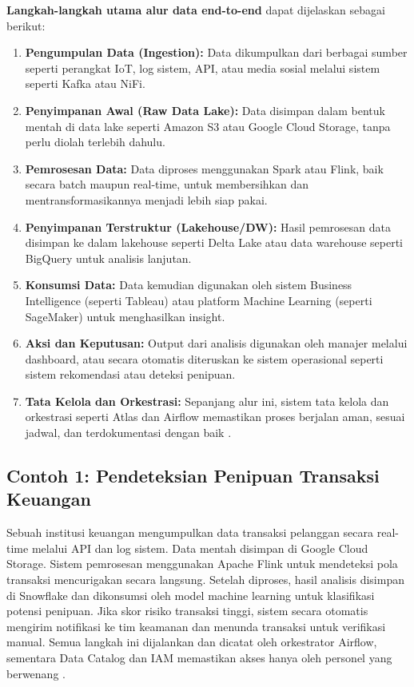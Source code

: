 \textbf{Langkah-langkah utama alur data end-to-end} dapat dijelaskan sebagai berikut:

\begin{enumerate}
	\item \textbf{Pengumpulan Data (Ingestion):} Data dikumpulkan dari berbagai sumber seperti perangkat IoT, log sistem, API, atau media sosial melalui sistem seperti Kafka atau NiFi.
	
	\item \textbf{Penyimpanan Awal (Raw Data Lake):} Data disimpan dalam bentuk mentah di data lake seperti Amazon S3 atau Google Cloud Storage, tanpa perlu diolah terlebih dahulu.
	
	\item \textbf{Pemrosesan Data:} Data diproses menggunakan Spark atau Flink, baik secara batch maupun real-time, untuk membersihkan dan mentransformasikannya menjadi lebih siap pakai.
	
	\item \textbf{Penyimpanan Terstruktur (Lakehouse/DW):} Hasil pemrosesan data disimpan ke dalam lakehouse seperti Delta Lake atau data warehouse seperti BigQuery untuk analisis lanjutan.
	
	\item \textbf{Konsumsi Data:} Data kemudian digunakan oleh sistem Business Intelligence (seperti Tableau) atau platform Machine Learning (seperti SageMaker) untuk menghasilkan insight.
	
	\item \textbf{Aksi dan Keputusan:} Output dari analisis digunakan oleh manajer melalui dashboard, atau secara otomatis diteruskan ke sistem operasional seperti sistem rekomendasi atau deteksi penipuan.
	
	\item \textbf{Tata Kelola dan Orkestrasi:} Sepanjang alur ini, sistem tata kelola dan orkestrasi seperti Atlas dan Airflow memastikan proses berjalan aman, sesuai jadwal, dan terdokumentasi dengan baik \cite{olson2020practical}.
\end{enumerate}

\subsection*{Contoh 1: Pendeteksian Penipuan Transaksi Keuangan}

Sebuah institusi keuangan mengumpulkan data transaksi pelanggan secara real-time melalui API dan log sistem. Data mentah disimpan di Google Cloud Storage. Sistem pemrosesan menggunakan Apache Flink untuk mendeteksi pola transaksi mencurigakan secara langsung. Setelah diproses, hasil analisis disimpan di Snowflake dan dikonsumsi oleh model machine learning untuk klasifikasi potensi penipuan. Jika skor risiko transaksi tinggi, sistem secara otomatis mengirim notifikasi ke tim keamanan dan menunda transaksi untuk verifikasi manual. Semua langkah ini dijalankan dan dicatat oleh orkestrator Airflow, sementara Data Catalog dan IAM memastikan akses hanya oleh personel yang berwenang \cite{kim2019fraud}.

